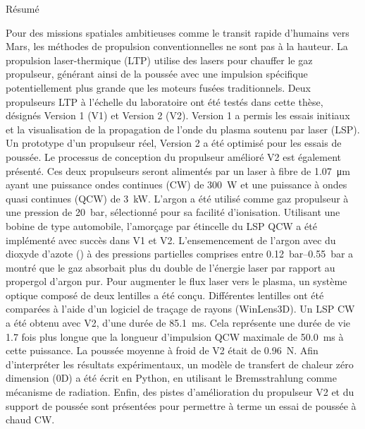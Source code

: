 
\begin{plainchp}{Résumé}

    Pour des missions spatiales ambitieuses comme le transit rapide d'humains vers Mars, les méthodes de propulsion conventionnelles ne sont pas à la hauteur. La propulsion laser-thermique (LTP) utilise des lasers pour chauffer le gaz propulseur, générant ainsi de la poussée avec une impulsion spécifique potentiellement plus grande que les moteurs fusées traditionnels. Deux propulseurs LTP à l'échelle du laboratoire ont été testés dans cette thèse, désignés Version 1 (V1) et Version 2 (V2). Version 1 a permis les essais initiaux et la visualisation de la propagation de l'onde du plasma soutenu par laser (LSP). Un prototype d'un propulseur réel, Version 2 a été optimisé pour les essais de poussée. Le processus de conception du propulseur amélioré V2 est également présenté. Ces deux propulseurs seront alimentés par un laser à fibre de \qty{1.07}{μm} ayant une puissance ondes continues (CW) de \qty{300}{W} et une puissance à ondes quasi continues (QCW) de \qty{3}{kW}. L'argon a été utilisé comme gaz propulseur à une pression de \qty{20}{bar}, sélectionné pour sa facilité d'ionisation. Utilisant une bobine de type automobile, l'amorçage par étincelle du LSP QCW a été implémenté avec succès dans V1 et V2. L'ensemencement de l'argon avec du dioxyde d'azote () à des pressions partielles comprises entre \qtyrange{.12}{.55}{bar} a montré que le gaz absorbait plus du double de l'énergie laser par rapport au propergol d'argon pur. Pour augmenter le flux laser vers le plasma, un système optique composé de deux lentilles a été conçu. Différentes lentilles ont été comparées à l'aide d'un logiciel de traçage de rayons (WinLens3D). Un LSP CW a été obtenu avec V2, d'une durée de \qty{85.1}{ms}. Cela représente une durée de vie 1.7 fois plus longue que la longueur d'impulsion QCW maximale de \qty{50.0}{ms} à cette puissance. La poussée moyenne à froid de V2 était de \qty{0.96}{N}. Afin d'interpréter les résultats expérimentaux, un modèle de transfert de chaleur zéro dimension (0D) a été écrit en Python, en utilisant le Bremsstrahlung comme mécanisme de radiation. Enfin, des pistes d'amélioration du propulseur V2 et du support de poussée sont présentées pour permettre à terme un essai de poussée à chaud CW.
    
\end{plainchp}